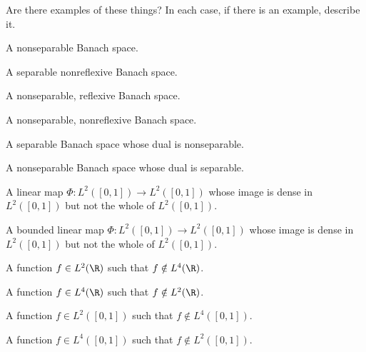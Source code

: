 Are there examples of these things?  In each case, if there is an
example, describe it.
\begin{alist}
\item A nonseparable Banach space.
\item A separable nonreflexive Banach space.
\item A nonseparable, reflexive Banach space.
\item A nonseparable, nonreflexive Banach space.
\item A separable Banach space whose dual is nonseparable.
\item A nonseparable Banach space whose dual is separable.
\item A linear map $\Phi:L^2([0,1])\rightarrow L^2([0,1])$ whose image
is dense in $L^2([0,1])$ but not the whole of $L^2([0,1])$.
\item A bounded linear map $\Phi:L^2([0,1])\rightarrow L^2([0,1])$
whose image is dense in $L^2([0,1])$ but not the whole of $L^2([0,1])$.
\item A function $f\in L^2(\R)$ such that $f\notin L^4(\R)$.
\item A function $f\in L^4(\R)$ such that $f\notin L^2(\R)$.
\item A function $f\in L^2([0,1])$ such that $f\notin L^4([0,1])$.
\item A function $f\in L^4([0,1])$ such that $f\notin L^2([0,1])$.
\end{alist}

